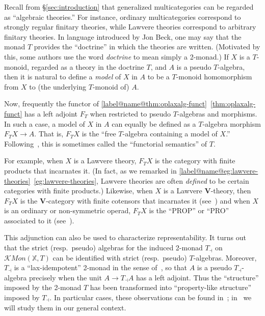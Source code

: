 \documentclass{tac}
\makeatletter
\newcommand{\V}{\ensuremath{\mathbf{V}}}
\newcommand{\KMon}{\mathcal{K}\mathit{Mon}}
\numberwithin{equation}{section}
\def\currthmtype{}
\def\autoref#1{\ref*{label@name@#1}~\ref{#1}}
\def\autoref#1{\ref{label@name@#1}~\ref{#1}}
\let\old@label\label
\def\label#1{%
    {\let\your@currentlabel\@currentlabel%
      \edef\@currentlabel{\currthmtype}%
      \old@label{label@name@#1}}%
    \old@label{#1}}
\makeatother
\begin{document}
\begin{remark}\label{rmk:free-models}
  Recall from \S\ref{sec:introduction} that generalized
  multicategories can be regarded as ``algebraic theories.''  For
  instance, ordinary multicategories correspond to strongly regular
  finitary theories, while Lawvere theories correspond to arbitrary
  finitary theories.  In language introduced by Jon Beck, one may say
  that the monad $T$ provides the ``doctrine'' in which the theories
  are written.  (Motivated by this, some authors use the word
  \emph{doctrine} to mean simply a 2-monad.)
  If $X$ is a $T$-monoid, regarded as a theory in the
  doctrine $T$, and $A$ is a pseudo $T$-algebra, then it is natural to
  define a \emph{model} of $X$ in $A$ to be a $T$-monoid homomorphism
  from $X$ to (the underlying $T$-monoid of) $A$.

Now, frequently the functor of \autoref{thm:oplaxalg-funct} has a left
adjoint $F_T$ when restricted to pseudo $T$-algebras and morphisms.
In such a case, a model of $X$ in $A$ can equally be defined as a
$T$-algebra morphism $F_TX\to A$.  That is, $F_T X$ is the ``free
$T$-algebra containing a model of $X$.''
Following~\cite{lawvere:functsem}, this is sometimes called the
``functorial semantics'' of $T$. 

  For example, when $X$ is a Lawvere theory, $F_T X$ is the category with finite
  products that incarnates it.  (In fact, as we remarked in
  \autoref{eg:lawvere-theories}, Lawvere theories are often
  \emph{defined} to be certain categories with finite products.)
  Likewise, when $X$ is a Lawvere \V-theory, then $F_T X$ is the
  \V-category with finite cotensors that incarnates it
  (see~\cite{power:enr-theories}) and when $X$ is an ordinary or
  non-symmetric operad, $F_T X$ is the ``PROP'' or ``PRO'' associated to
  it (see~\cite{bv:htpy-invar}).

  This adjunction can also be used to characterize representability.
  It turns out that the strict (resp.\ pseudo) algebras for the
  induced 2-monad $T_\dashv$ on $\KMon(\mathbb{X},T)$ can be identified
  with strict (resp.\ pseudo) $T$-algebras.  Moreover, $T_\dashv$ is a
  ``lax-idempotent'' 2-monad in the sense of~\cite{kl:property-like},
  so that $A$ is a pseudo $T_\dashv$-algebra precisely when the unit
  $A\to T_\dashv A$ has a left adjoint.  Thus the ``structure''
  imposed by the 2-monad $T$ has been transformed into ``property-like
  structure'' imposed by $T_\dashv$.  In particular cases, these
  observations can be found
  in~\cite{HermidaRepresentable,HermidaCoherent,penon:tcats-rep};
  in~\cite{cs:laxidem} we will study them in our general context.
\end{remark}
\end{document}
